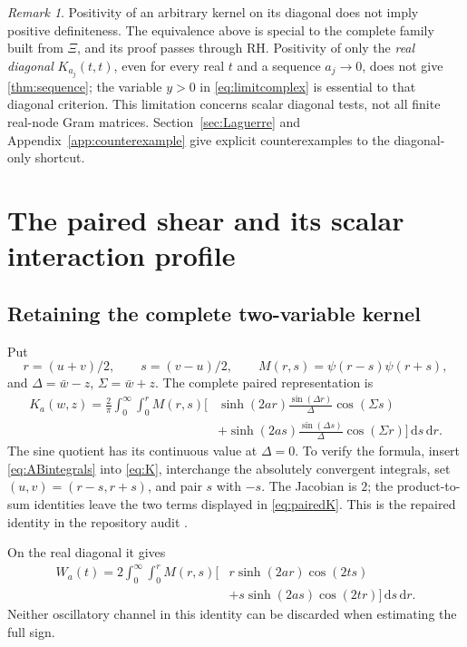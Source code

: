 \documentclass[11pt,letterpaper]{article}
\numberwithin{equation}{section}
\theoremstyle{definition}
\theoremstyle{remark}
\newtheorem{remark}[theorem]{Remark}
\newcommand{\dd}{\,\mathrm d}
\begin{document}
\begin{remark}
Positivity of an arbitrary kernel on its diagonal does not imply positive definiteness. The equivalence above is special to the complete family built from $\Xi$, and its proof passes through RH. Positivity of only the \emph{real diagonal} $K_{a_j}(t,t)$, even for every real $t$ and a sequence $a_j\to0$, does not give \cref{thm:sequence}; the variable $y>0$ in \eqref{eq:limitcomplex} is essential to that diagonal criterion. This limitation concerns scalar diagonal tests, not all finite real-node Gram matrices. Section~\ref{sec:Laguerre} and Appendix~\ref{app:counterexample} give explicit counterexamples to the diagonal-only shortcut.
\end{remark}

\section{The paired shear and its scalar interaction profile}
\subsection{Retaining the complete two-variable kernel}
Put
\[
r=(u+v)/2,\qquad s=(v-u)/2,\qquad
M(r,s)=\psi(r-s)\psi(r+s),
\]
and $\Delta=\bar w-z$, $\Sigma=\bar w+z$. The complete paired representation is
\begin{equation}\label{eq:pairedK}
\begin{split}
K_a(w,z)=\frac2\pi\int_0^\infty\!\int_0^r M(r,s)
\bigg[&\sinh(2ar)\frac{\sin(\Delta r)}{\Delta}\cos(\Sigma s)\\
&+\sinh(2as)\frac{\sin(\Delta s)}{\Delta}\cos(\Sigma r)\bigg]\dd s\dd r.
\end{split}
\end{equation}
The sine quotient has its continuous value at $\Delta=0$. To verify the formula, insert \eqref{eq:ABintegrals} into \eqref{eq:K}, interchange the absolutely convergent integrals, set $(u,v)=(r-s,r+s)$, and pair $s$ with $-s$. The Jacobian is $2$; the product-to-sum identities leave the two terms displayed in \eqref{eq:pairedK}. This is the repaired identity in the repository audit \cite{repo}.

On the real diagonal it gives
\begin{equation}\label{eq:pairedW}
\begin{split}
W_a(t)=2\int_0^\infty\!\int_0^r M(r,s)
\big[&r\sinh(2ar)\cos(2ts)\\
&+s\sinh(2as)\cos(2tr)\big]\dd s\dd r.
\end{split}
\end{equation}
Neither oscillatory channel in this identity can be discarded when estimating the full sign.
\end{document}
